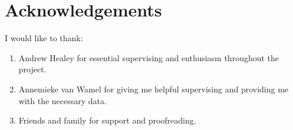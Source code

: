 \section{Acknowledgements}
I would like to thank:
\begin{enumerate}
	\item Andrew Healey for essential supervising and enthusiasm throughout the project.
	\item Annemieke van Wamel for giving me helpful supervising and providing me with the necessary data. 
	\item Friends and family for support and proofreading.
\end{enumerate}